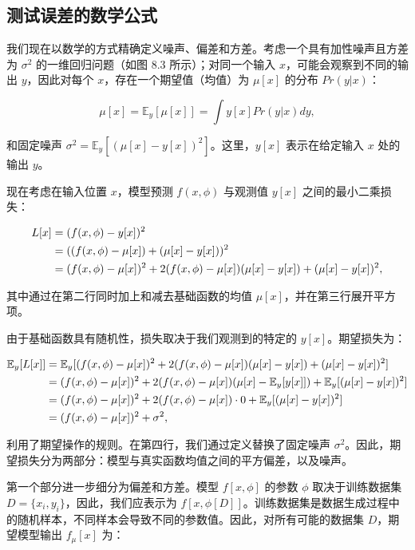\subsection{测试误差的数学公式}
我们现在以数学的方式精确定义噪声、偏差和方差。考虑一个具有加性噪声且方差为 \(\sigma^2\) 的一维回归问题（如图 8.3 所示）；对同一个输入 \(x\)，可能会观察到不同的输出 \(y\)，因此对每个 \(x\)，存在一个期望值（均值）为 \(\mu[x]\) 的分布 \(Pr(y|x)\)：

\begin{equation}
\mu[x] = \mathbb{E}_y[\mu[x]] = \int y[x] Pr(y|x)dy, 
\end{equation}


和固定噪声 \(\sigma^2 = \mathbb{E}_y [(\mu[x] - y[x])^2]\)。这里，\(y[x]\) 表示在给定输入 \(x\) 处的输出 \(y\)。

现在考虑在输入位置 \(x\)，模型预测 \(f(x, \phi)\) 与观测值 \(y[x]\) 之间的最小二乘损失：


\begin{align}
L[x] &= (f(x, \phi) - y[x])^2 \notag \\
&= ((f(x, \phi) - \mu[x]) + (\mu[x] - y[x]))^2 \notag \\
&= (f(x, \phi) - \mu[x])^2 + 2(f(x, \phi) - \mu[x])(\mu[x] - y[x]) + (\mu[x] - y[x])^2, 
\end{align} 


其中通过在第二行同时加上和减去基础函数的均值 \(\mu[x]\)，并在第三行展开平方项。

由于基础函数具有随机性，损失取决于我们观测到的特定的 \(y[x]\)。期望损失为：

\begin{align}
\mathbb{E}_y[L[x]] &= \mathbb{E}_y[(f(x, \phi) - \mu[x])^2 + 2(f(x, \phi) - \mu[x])(\mu[x] - y[x]) + (\mu[x] - y[x])^2] \notag \\
&= (f(x, \phi) - \mu[x])^2 + 2(f(x, \phi) - \mu[x])(\mu[x] - \mathbb{E}_y[y[x]]) + \mathbb{E}_y[(\mu[x] - y[x])^2] \notag \\
&= (f(x, \phi) - \mu[x])^2 + 2(f(x, \phi) - \mu[x]) \cdot 0 + \mathbb{E}_y[(\mu[x] - y[x])^2] \notag \\
&= (f(x, \phi) - \mu[x])^2 + \sigma^2, 
\end{align} 


利用了期望操作的规则。在第四行，我们通过定义替换了固定噪声 \(\sigma^2\)。因此，期望损失分为两部分：模型与真实函数均值之间的平方偏差，以及噪声。

第一个部分进一步细分为偏差和方差。模型 \(f[x, \phi]\) 的参数 \(\phi\) 取决于训练数据集 \(D = \{x_i, y_i\}\)，因此，我们应表示为 \(f[x, \phi[D]]\)。训练数据集是数据生成过程中的随机样本，不同样本会导致不同的参数值。因此，对所有可能的数据集 \(D\)，期望模型输出 \(f_\mu[x]\) 为：

